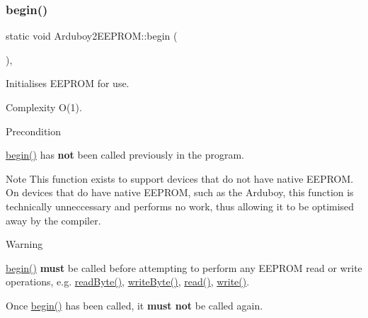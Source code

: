 \subsubsection{\texorpdfstring{begin()}{begin()}}
{\footnotesize\ttfamily static void Arduboy2\+E\+E\+P\+R\+O\+M\+::begin (\begin{DoxyParamCaption}{ }\end{DoxyParamCaption})\hspace{0.3cm}{\ttfamily [inline]}, {\ttfamily [static]}}



Initialises E\+E\+P\+R\+OM for use. 

\begin{DoxyParagraph}{Complexity}
{\ttfamily O(1)}.
\end{DoxyParagraph}
\begin{DoxyPrecond}{Precondition}
\begin{DoxyItemize}
\item {\ttfamily \mbox{\hyperlink{classArduboy2EEPROM_a4d482ef8e8204c56a0feba68791bc0c8}{begin()}}} has {\bfseries{not}} been called previously in the program.\end{DoxyItemize}

\end{DoxyPrecond}
\begin{DoxyNote}{Note}
This function exists to support devices that do not have native E\+E\+P\+R\+OM. On devices that do have native E\+E\+P\+R\+OM, such as the Arduboy, this function is technically unneccessary and performs no work, thus allowing it to be optimised away by the compiler.
\end{DoxyNote}
\begin{DoxyWarning}{Warning}
\begin{DoxyItemize}
\item {\ttfamily \mbox{\hyperlink{classArduboy2EEPROM_a4d482ef8e8204c56a0feba68791bc0c8}{begin()}}} {\bfseries{must}} be called before attempting to perform any E\+E\+P\+R\+OM read or write operations, e.\+g. {\ttfamily \mbox{\hyperlink{classArduboy2EEPROM_aec3f9eea5f4adc592da921df2ae7ba2d}{read\+Byte()}}}, {\ttfamily \mbox{\hyperlink{classArduboy2EEPROM_a104991fb0112413980ee163aaa14d891}{write\+Byte()}}}, {\ttfamily \mbox{\hyperlink{classArduboy2EEPROM_a6e9b09f0b94295c040204ca0cb674649}{read()}}}, {\ttfamily \mbox{\hyperlink{classArduboy2EEPROM_abf7be1f27f4815de59257210dac8c9eb}{write()}}}. \item Once {\ttfamily \mbox{\hyperlink{classArduboy2EEPROM_a4d482ef8e8204c56a0feba68791bc0c8}{begin()}}} has been called, it {\bfseries{must not}} be called again. \end{DoxyItemize}

\end{DoxyWarning}


